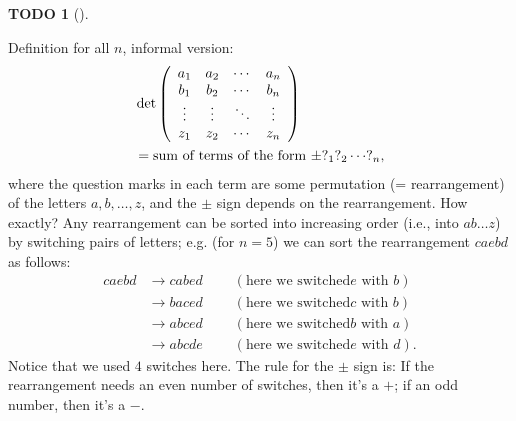 \documentclass[numbers=enddot,12pt,final,onecolumn,notitlepage]{scrartcl}%
\theoremstyle{definition}
\newtheorem{quest}[theo]{TODO}
\newenvironment{todo}[1][]
{\begin{quest}[#1]\begin{leftbar}}
{\end{leftbar}\end{quest}}
\begin{document}
\begin{todo}
Definition for all $n$, informal version:%
\begin{align*}
&  \det\left(
\begin{array}
[c]{cccc}%
a_{1} & a_{2} & \cdots & a_{n}\\
b_{1} & b_{2} & \cdots & b_{n}\\
\vdots & \vdots & \ddots & \vdots\\
z_{1} & z_{2} & \cdots & z_{n}%
\end{array}
\right) \\
&  =\text{sum of terms of the form }\pm?_{1}?_{2}\cdots?_{n},
\end{align*}
where the question marks in each term are some permutation (= rearrangement)
of the letters $a,b,\ldots,z$, and the $\pm$ sign depends on the
rearrangement. How exactly? Any rearrangement can be sorted into increasing
order (i.e., into $ab\ldots z$) by switching pairs of letters; e.g. (for
$n=5$) we can sort the rearrangement $caebd$ as follows:%
\begin{align*}
caebd  &  \rightarrow cabed\ \ \ \ \ \ \ \ \ \ \left(  \text{here we switched
}e\text{ with }b\right) \\
&  \rightarrow baced\ \ \ \ \ \ \ \ \ \ \left(  \text{here we switched
}c\text{ with }b\right) \\
&  \rightarrow abced\ \ \ \ \ \ \ \ \ \ \left(  \text{here we switched
}b\text{ with }a\right) \\
&  \rightarrow abcde\ \ \ \ \ \ \ \ \ \ \left(  \text{here we switched
}e\text{ with }d\right)  .
\end{align*}
Notice that we used $4$ switches here. The rule for the $\pm$ sign is: If the
rearrangement needs an even number of switches, then it's a $+$; if an odd
number, then it's a $-$.


\end{todo}
\end{document}
